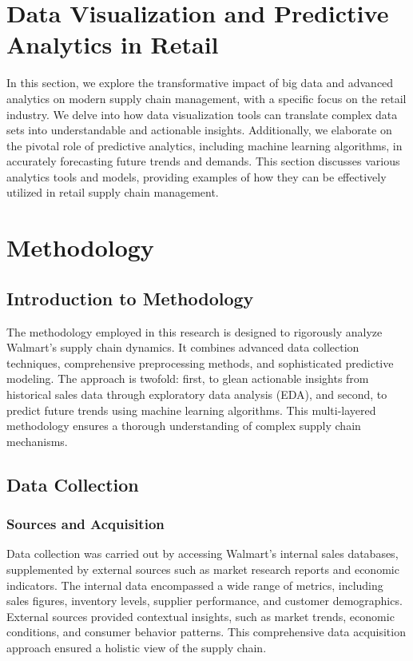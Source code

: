 \documentclass[conference]{IEEEtran}
\begin{document}
\section{Data Visualization and Predictive Analytics in Retail}
In this section, we explore the transformative impact of big data and advanced analytics on modern supply chain management, with a specific focus on the retail industry. We delve into how data visualization tools can translate complex data sets into understandable and actionable insights. Additionally, we elaborate on the pivotal role of predictive analytics, including machine learning algorithms, in accurately forecasting future trends and demands. This section discusses various analytics tools and models, providing examples of how they can be effectively utilized in retail supply chain management.

\section{Methodology}

\subsection{Introduction to Methodology}
The methodology employed in this research is designed to rigorously analyze Walmart's supply chain dynamics. It combines advanced data collection techniques, comprehensive preprocessing methods, and sophisticated predictive modeling. The approach is twofold: first, to glean actionable insights from historical sales data through exploratory data analysis (EDA), and second, to predict future trends using machine learning algorithms. This multi-layered methodology ensures a thorough understanding of complex supply chain mechanisms.

\subsection{Data Collection}

\subsubsection{Sources and Acquisition}
Data collection was carried out by accessing Walmart's internal sales databases, supplemented by external sources such as market research reports and economic indicators. The internal data encompassed a wide range of metrics, including sales figures, inventory levels, supplier performance, and customer demographics. External sources provided contextual insights, such as market trends, economic conditions, and consumer behavior patterns. This comprehensive data acquisition approach ensured a holistic view of the supply chain.
\end{document}
